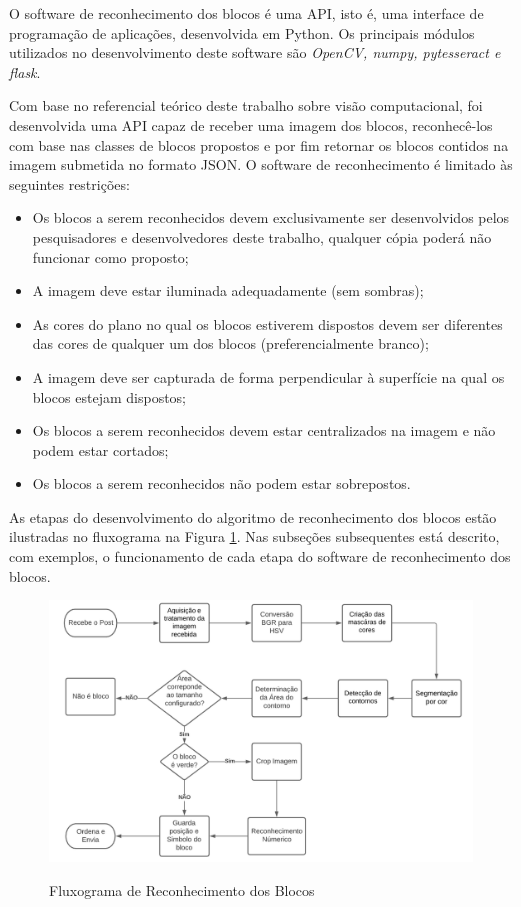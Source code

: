     O software de reconhecimento dos blocos é uma API, isto é, uma interface de programação de aplicações,  desenvolvida em Python. Os principais módulos utilizados no desenvolvimento deste software são \textit{OpenCV, numpy, pytesseract e flask}.

    Com base no referencial teórico deste trabalho sobre visão computacional, foi desenvolvida uma API capaz de receber uma imagem dos blocos, reconhecê-los com base nas classes de blocos propostos e por fim retornar os blocos contidos na imagem submetida no formato JSON. O software de reconhecimento é limitado às seguintes restrições:
    
        \begin{itemize}
        \item Os blocos a serem reconhecidos devem exclusivamente ser desenvolvidos pelos pesquisadores e desenvolvedores deste trabalho, qualquer cópia poderá não funcionar como proposto;
        \item A imagem deve estar iluminada adequadamente (sem sombras);
        \item As cores do plano no qual os blocos estiverem dispostos devem ser diferentes das cores de qualquer um dos blocos (preferencialmente branco);
        \item A imagem deve ser capturada de forma perpendicular à superfície na qual os blocos estejam dispostos;
       \item Os blocos a serem reconhecidos devem estar centralizados na imagem e não podem estar cortados;
      \item Os blocos a serem reconhecidos não podem estar sobrepostos.
    \end{itemize}

    As etapas do desenvolvimento do algoritmo de reconhecimento dos blocos estão ilustradas no fluxograma na Figura \ref{figura:fluxo}. 
    Nas subseções subsequentes está descrito, com exemplos, o funcionamento de cada etapa do software de reconhecimento dos blocos.
    
    \begin{figure}[H]
        \caption{Fluxograma de Reconhecimento dos Blocos}
        \centering
        \includegraphics[width=\linewidth]{Imagens/Cap4/fluxo.PNG}
        \label{figura:fluxo}
    \end{figure}


